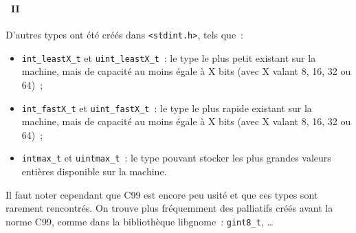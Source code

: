 \begin{frame}[containsverbatim]
  \frametitle{\secname}
  \framesubtitle{\subsecname~II}

  \par
  D'autres types ont été créés dans \verb|<stdint.h>|, tels que~:
  \begin{itemize}
    \item \verb|int_leastX_t| et \verb|uint_leastX_t|~: le type le plus petit existant sur la machine, mais de capacité au moins égale à X bits (avec X valant 8, 16, 32 ou 64)~;
    \item \verb|int_fastX_t| et \verb|uint_fastX_t|~: le type le plus rapide existant sur la machine, mais de capacité au moins égale à X bits (avec X valant 8, 16, 32 ou 64)~;
    \item \verb|intmax_t| et \verb|uintmax_t|~: le type pouvant stocker les plus grandes valeurs entières disponible sur la machine.
  \end{itemize}
  \vspace{0.5cm}
  \par
  Il faut noter cependant que C99 est encore peu usité et que ces types sont rarement rencontrés. On trouve plus fréquemment des palliatifs créés avant la norme C99, comme dans la bibliothèque libgnome~: \verb|gint8_t|, \ldots  
  
\end{frame}

